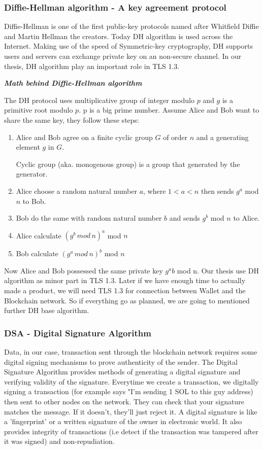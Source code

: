 \subsubsection{Diffie-Hellman algorithm - A key agreement protocol}
Diffie-Hellman is one of the first public-key protocols named after Whitfield Diffie and Martin Hellman the creators.
Today DH algorithm is used across the Internet.
Making use of the speed of Symmetric-key cryptography, DH supports users and servers can exchange private key on an non-secure channel.
In our thesis, DH algorithm play an important role in TLS 1.3.

\bigskip
{\textit {\textbf{Math behind Diffie-Hellman algorithm}}}

The DH protocol uses multiplicative group of integer modulo $p$ and $g$ is a primitive root modulo $p$.
p is a big prime number.
Assume Alice and Bob want to share the same key, they follow these steps:
\begin{enumerate}
  \item Alice and Bob agree on a finite cyclic group $G$ of order $n$ and a generating element $g$ in $G$.
        \begin{definition}
          Cyclic group (aka. monogenous group) is a group that generated by the generator.
        \end{definition}
  \item Alice choose a random natural number $a$, where $1 < a < n$ then sends $g^a$ mod $n$ to Bob.
  \item Bob do the same with random natural number $b$ and sends $g^b$ mod $n$ to Alice.
  \item Alice calculate $(g^b \, mod \, n)^a$ mod $n$
  \item Bob calculate $(g^a \, mod \, n)^b$ mod $n$
\end{enumerate}
Now Alice and Bob possessed the same private key $g^ab$ mod n.
Our thesis use DH algorithm as minor part in TLS 1.3.
Later if we have enough time to actually made a product, we will need TLS 1.3 for connection between Wallet and the Blockchain network.
So if everything go as planned, we are going to mentioned further DH base algorithm.

\subsubsection{DSA - Digital Signature Algorithm}
Data, in our case, transaction sent through the blockchain network requires some digital signing mechanisms to prove authenticity of the sender.
The Digital Signature Algorithm provides methods of generating a digital signature and verifying validity of the signature.
Everytime we create a transaction, we digitally signing a transaction (for example says "I'm sending 1 SOL to this guy address) then sent to other nodes on the network.
They can check that your signature matches the message. If it doesn’t, they’ll just reject it.
A digital signature is like a 'fingerprint' or a written signature of the owner in electronic world.
It also provides integrity of transactions (i.e detect if the transaction was tampered after it was signed) and non-repudiation.

